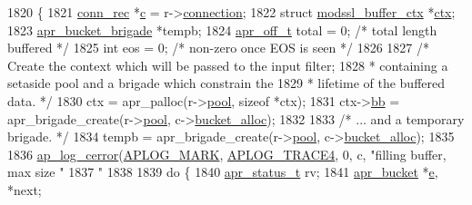 \begin{DoxyCode}
1820 \{
1821     \hyperlink{structconn__rec}{conn\_rec} *\hyperlink{group__APACHE__CORE__HTTPD_ga7cce37ef8558e46f408cb4d0f555605b}{c} = r->\hyperlink{structrequest__rec_a0924aae55826638314f76952ca5d60b1}{connection};
1822     \textcolor{keyword}{struct }\hyperlink{structmodssl__buffer__ctx}{modssl\_buffer\_ctx} *\hyperlink{group__APACHE__CORE__FILTER_ga94af791485570bea922969fef12d6259}{ctx};
1823     \hyperlink{structapr__bucket__brigade}{apr\_bucket\_brigade} *tempb;
1824     \hyperlink{group__apr__platform_ga6938af9075cec15c88299109381aa984}{apr\_off\_t} total = 0; \textcolor{comment}{/* total length buffered */}
1825     \textcolor{keywordtype}{int} eos = 0; \textcolor{comment}{/* non-zero once EOS is seen */}
1826 
1827     \textcolor{comment}{/* Create the context which will be passed to the input filter;}
1828 \textcolor{comment}{     * containing a setaside pool and a brigade which constrain the}
1829 \textcolor{comment}{     * lifetime of the buffered data. */}
1830     ctx = apr\_palloc(r->\hyperlink{structrequest__rec_aa0a0c16f9a9ab3901cdb3f3c9c9d83d0}{pool}, \textcolor{keyword}{sizeof} *ctx);
1831     ctx->\hyperlink{structmodssl__buffer__ctx_a191e5daeba128f104a07c61a0f9bc312}{bb} = apr\_brigade\_create(r->\hyperlink{structrequest__rec_aa0a0c16f9a9ab3901cdb3f3c9c9d83d0}{pool}, c->\hyperlink{structconn__rec_a5a9ee4911c5a655131f76a04036fb4c0}{bucket\_alloc});
1832 
1833     \textcolor{comment}{/* ... and a temporary brigade. */}
1834     tempb = apr\_brigade\_create(r->\hyperlink{structrequest__rec_aa0a0c16f9a9ab3901cdb3f3c9c9d83d0}{pool}, c->\hyperlink{structconn__rec_a5a9ee4911c5a655131f76a04036fb4c0}{bucket\_alloc});
1835 
1836     \hyperlink{group__APACHE__CORE__LOG_ga60ef6919b8e1b691b0c1ac4d67c9449f}{ap\_log\_cerror}(\hyperlink{group__APACHE__CORE__LOG_ga655e126996849bcb82e4e5a14c616f4a}{APLOG\_MARK}, \hyperlink{group__APACHE__CORE__LOG_ga479289550d998526187ff78880378f9c}{APLOG\_TRACE4}, 0, c, \textcolor{stringliteral}{"filling buffer, max
       size "}
1837                   \textcolor{stringliteral}{"%
1838 
1839     \textcolor{keywordflow}{do} \{
1840         \hyperlink{group__apr__errno_gaa5105fa83cc322f09382292db8b47593}{apr\_status\_t} rv;
1841         \hyperlink{structapr__bucket}{apr\_bucket} *\hyperlink{group__APR__Util__Bucket__Brigades_gacd90314acb2c2e5cd19681136c08efac}{e}, *next;
}
\end{DoxyCode}
